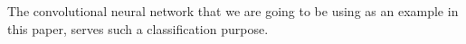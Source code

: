 The convolutional neural network that we are going to be using as an example in this paper, serves such a classification purpose.

\startsubsection[title=Traning a neural network with a cost function]

\stopsubsection

\startsubsection[title=Optimization]

\stopsubsection

\startsubsection[title=Forward and backward propagation]

\stopsubsection

\stopsection

\stopsection
